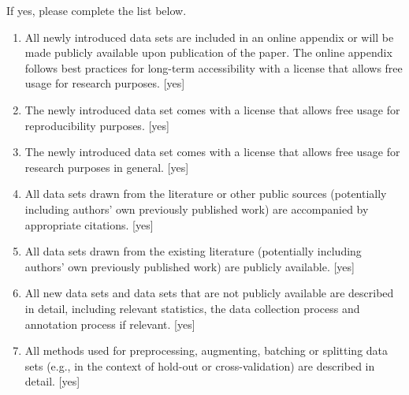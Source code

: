\documentclass[review]{jair}
\begin{document}
If yes, please complete the list below.
\begin{enumerate}
    \item 
    All newly introduced data sets 
    are included in an online appendix 
    or will be made publicly available upon publication of the paper.
    The online appendix follows best practices for long-term accessibility with a license
    that allows free usage for research purposes.
    [yes]
    \item The newly introduced data set comes with a license that
    allows free usage for reproducibility purposes.
    [yes]
    \item The newly introduced data set comes with a license that
    allows free usage for research purposes in general.
    [yes]
    \item All data sets drawn from the literature or other public sources (potentially including authors' own previously published work) are accompanied by appropriate citations.
    [yes]
    \item All data sets drawn from the existing literature (potentially including authors’ own previously published work) are publicly available. [yes]
    \item All new data sets and data sets that are not publicly available are described in detail, including relevant statistics, the data collection process and annotation process if relevant.
    [yes]
    \item 
    All methods used for preprocessing, augmenting, batching or splitting data sets (e.g., in the context of hold-out or cross-validation)
    are described in detail. [yes]
\end{enumerate}
\end{document}
